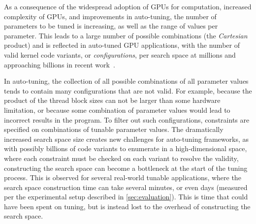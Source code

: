 As a consequence of the widespread adoption of GPUs for computation, increased complexity of GPUs, and improvements in auto-tuning, the number of parameters to be tuned is increasing, as well as the range of values per parameter. This leads to a large number of possible combinations (the \emph{Cartesian} product) and is reflected in auto-tuned GPU applications, with the number of valid kernel code variants, or {\em configurations}, per search space at millions and approaching billions in recent work~\cite{BenchmarkingSuiteKerneltuners, heldensKernelLauncherLibrary2023,BaCO2024}. 

In auto-tuning, the collection of all possible combinations of all parameter values tends to contain many configurations that are not valid. For example, because the product of the thread block sizes can not be larger than some hardware limitation, or because some combination of parameter values would lead to incorrect results in the program. To filter out such configurations, constraints are specified on combinations of tunable parameter values. 
The dramatically increased search space size creates new challenges for auto-tuning frameworks, as with possibly billions of code variants to enumerate in a high-dimensional space, where each constraint must be checked on each variant to resolve the validity, constructing the search space can become a bottleneck at the start of the tuning process. 
This is observed for several real-world tunable applications, where the search space construction time can take several minutes, or even days (measured per the experimental setup described in \cref{sec:evaluation}). This is time that could have been spent on tuning, but is instead lost to the overhead of constructing the search space. %


